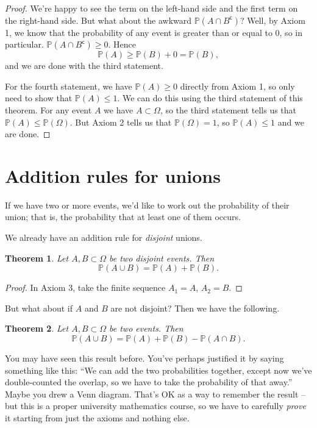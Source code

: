 \documentclass[
  a4paper,
]{book}
\newtheorem{theorem}{Theorem}[chapter]
\theoremstyle{definition}
\theoremstyle{definition}
\theoremstyle{definition}
\theoremstyle{definition}
\theoremstyle{remark}
\begin{document}
\begin{proof}
We're happy to see the term on the left-hand side and the first term on the right-hand side. But what about the awkward \(\mathbb P(A \cap B^\mathsf{c})\)? Well, by Axiom 1, we know that the probability of any event is greater than or equal to 0, so in particular. \(\mathbb P(A \cap B^\mathsf{c}) \geq 0\). Hence
\[ \mathbb P(A)  \geq \mathbb P(B) + 0 = \mathbb P(B) , \]
and we are done with the third statement.

For the fourth statement, we have \(\mathbb P(A) \geq 0\) directly from Axiom 1, so only need to show that \(\mathbb P(A) \leq 1\). We can do this using the third statement of this theorem. For any event \(A\) we have \(A \subset \Omega\), so the third statement tells us that \(\mathbb P(A) \leq \mathbb P(\Omega)\). But Axiom 2 tells us that \(\mathbb P(\Omega) = 1\), so \(\mathbb P(A) \leq 1\) and we are done.
\end{proof}

\hypertarget{addition}{%
\section{Addition rules for unions}\label{addition}}

If we have two or more events, we'd like to work out the probability of their union; that is, the probability that at least one of them occurs.

We already have an addition rule for \emph{disjoint} unions.

\begin{theorem}
Let \(A, B \subset \Omega\) be two disjoint events. Then
\[ \mathbb P(A \cup B) = \mathbb P(A) + \mathbb P(B) . \]
\end{theorem}

\begin{proof}
In Axiom 3, take the finite sequence \(A_1 = A\), \(A_2 = B\).
\end{proof}

But what about if \(A\) and \(B\) are not disjoint? Then we have the following.

\begin{theorem}
Let \(A, B \subset \Omega\) be two events. Then
\[ \mathbb P(A \cup B) = \mathbb P(A) + \mathbb P(B) - \mathbb P(A \cap B) . \]
\end{theorem}

You may have seen this result before. You've perhaps justified it by saying something like this: ``We can add the two probabilities together, except now we've double-counted the overlap, so we have to take the probability of that away.'' Maybe you drew a Venn diagram. That's OK as a way to remember the result -- but this is a proper university mathematics course, so we have to carefully \emph{prove} it starting from just the axioms and nothing else.
\end{document}
